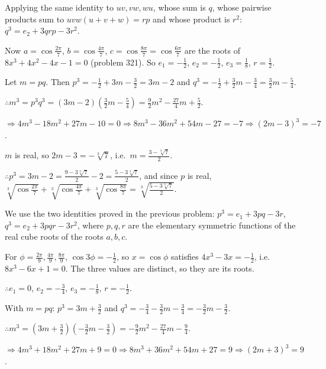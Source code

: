   Applying the same identity to $uv, vw, wu$, whose sum is $q$, whose pairwise products sum to $uvw(u + v + w)
  = rp$ and whose product is $r^2$: $q^3 = e_2 + 3qrp - 3r^2$.

  Now $a = \cos\frac{2\pi}{7}$, $b = \cos\frac{4\pi}{7}$, $c = \cos\frac{8\pi}{7} = \cos\frac{6\pi}{7}$ are the
  roots of $8x^3 + 4x^2 - 4x - 1 = 0$ (problem 321). So $e_1 = -\frac{1}{2}$, $e_2 = -\frac{1}{2}$, $e_3 = \frac{1}{8}$,
  $r = \frac{1}{2}$.

  Let $m = pq$. Then $p^3 = -\frac{1}{2} + 3m - \frac{3}{2} = 3m - 2$ and $q^3 = -\frac{1}{2} + \frac{3}{2}m
  - \frac{3}{4} = \frac{3}{2}m - \frac{5}{4}$.

  $\therefore m^3 = p^3q^3 = (3m - 2)\left(\frac{3}{2}m - \frac{5}{4}\right) = \frac{9}{2}m^2 - \frac{27}{4}m
  + \frac{5}{2}$.

  $\Rightarrow 4m^3 - 18m^2 + 27m - 10 = 0\Rightarrow 8m^3 - 36m^2 + 54m - 27 = -7\Rightarrow (2m - 3)^3 = -7$.

  $m$ is real, so $2m - 3 = -\sqrt[3]{7}$, i.e.\ $m = \frac{3 - \sqrt[3]{7}}{2}$.

  $\therefore p^3 = 3m - 2 = \frac{9 - 3\sqrt[3]{7}}{2} - 2 = \frac{5 - 3\sqrt[3]{7}}{2}$, and since $p$ is real,
  $\sqrt[3]{\cos\frac{2\pi}{7}} + \sqrt[3]{\cos\frac{4\pi}{7}} + \sqrt[3]{\cos\frac{8\pi}{7}}
  = \sqrt[3]{\frac{5 - 3\sqrt[3]{7}}{2}}$.
\item We use the two identities proved in the previous problem: $p^3 = e_1 + 3pq - 3r$, $q^3 = e_2 + 3pqr -
  3r^2$, where $p, q, r$ are the elementary symmetric functions of the real cube roots of the roots $a, b, c$.

  For $\phi = \frac{2\pi}{9}, \frac{4\pi}{9}, \frac{8\pi}{9}$, $\cos3\phi = -\frac{1}{2}$, so $x = \cos\phi$ satisfies
  $4x^3 - 3x = -\frac{1}{2}$, i.e.\ $8x^3 - 6x + 1 = 0$. The three values are distinct, so they are its roots.

  $\therefore e_1 = 0$, $e_2 = -\frac{3}{4}$, $e_3 = -\frac{1}{8}$, $r = -\frac{1}{2}$.

  With $m = pq$: $p^3 = 3m + \frac{3}{2}$ and $q^3 = -\frac{3}{4} - \frac{3}{2}m - \frac{3}{4} = -\frac{3}{2}m -
  \frac{3}{2}$.

  $\therefore m^3 = \left(3m + \frac{3}{2}\right)\left(-\frac{3}{2}m - \frac{3}{2}\right) = -\frac{9}{2}m^2 -
  \frac{27}{4}m - \frac{9}{4}$.

  $\Rightarrow 4m^3 + 18m^2 + 27m + 9 = 0\Rightarrow 8m^3 + 36m^2 + 54m + 27 = 9\Rightarrow (2m + 3)^3 = 9$.

